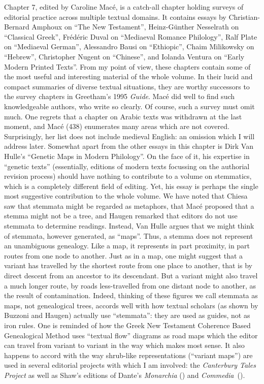 \begin{review}
Chapter 7, edited by Caroline Macé, is a catch-all chapter
holding surveys of editorial practice across multiple textual domains.
It contains essays by Christian-Bernard Amphoux on ``The New
Testament'', Heinz-Günther Nesselrath on ``Classical Greek'', Frédéric
Duval on ``Mediaeval Romance Philology'', Ralf Plate on ``Mediaeval
German'', Alessandro Bausi on ``Ethiopic'', Chaim Milikowsky on
``Hebrew'', Christopher Nugent on ``Chinese'', and Iolanda Ventura on
``Early Modern Printed Texts''. From my point of view, these chapters
contain some of the most useful and interesting material of the whole
volume. In their lucid and compact summaries of diverse textual
situations, they are worthy successors to the survey chapters in
Greetham's 1995 \emph{Guide}. Macé did well to find such knowledgeable
authors, who write so clearly. Of course, such a survey must omit much.
One regrets that a chapter on Arabic texts was withdrawn at the last
moment, and Macé (438) enumerates many areas which are not covered.
Surprisingly, her list does not include medieval English: an omission
which I will address later. Somewhat apart from the other essays in this
chapter is Dirk Van Hulle's ``Genetic Maps in Modern Philology''. On the
face of it, his expertise in ``genetic texts'' (essentially, editions of
modern texts focussing on the authorial revision process) should have
nothing to contribute to a volume on stemmatics, which is a completely
different field of editing. Yet, his essay is perhaps the single most
suggestive contribution to the whole volume. We have noted that Chiesa
saw that stemmata might be regarded as metaphors, that Macé proposed
that a stemma might not be a tree, and Haugen remarked that editors do
not use stemmata to determine readings. Instead, Van Hulle argues that
we might think of stemmata, however generated, as ``maps''. Thus, a
stemma does not represent an unambiguous genealogy. Like a map, it
represents in part proximity, in part routes from one node to another.
Just as in a map, one might suggest that a variant has travelled by the
shortest route from one place to another, that is by direct descent from
an ancestor to its descendant. But a variant might also travel a much
longer route, by roads less-travelled from one distant node to another,
as the result of contamination. Indeed, thinking of these figures we
call stemmata as maps, not genealogical trees, accords well with how
textual scholars (as shown by Buzzoni and Haugen) actually use
``stemmata'': they are used as guides, not as iron rules. One is
reminded of how the Greek New Testament Coherence Based Genealogical
Method uses ``textual flow'' diagrams as road maps which the editor can
travel from variant to variant in the way which makes most sense. It
also happens to accord with the way shrub-like representations
(``variant maps'') are used in several editorial projects with which I
am involved: the \emph{Canterbury Tales Project} \parencite{chaucer_canterbury_1991} as
well as Shaw's editions of Dante's \emph{Monarchia} (\citeyear{alighieri_monarchia_2019}) and
\mbox{\emph{Commedia} (\citeyear{alighieri_commedia_2021}).}


\end{review}

